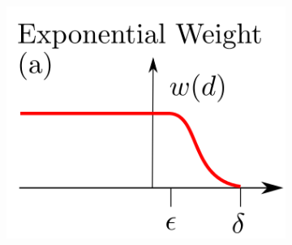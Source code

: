 \documentclass{beamer}
\begin{document}
{\begin{figure}[h]
\begin{subfigure}[h]{0.45\textwidth}
        \\
         \includegraphics[scale=0.29]{exponential_weight.png}
        \end{subfigure}
				
				

\end{figure}
}






%
\end{document}
